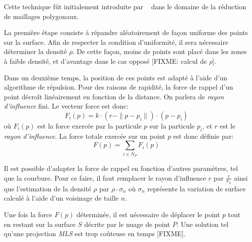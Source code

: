 Cette technique fût initialement introduite par \citeauthor{Turk1992}~\cite{Turk1992} dans le domaine de la réduction de maillages polygonaux.

La première étape consiste à répandre aléatoirement de façon uniforme des points sur la surface. Afin de respecter la condition d'uniformité, il sera nécessaire déterminer la densité $\rho$. De cette façon, moins de points sont placé dans les zones à faible densité, et d'avantage dans le cas opposé [FIXME: calcul de $\rho$].

Dans un deuxième temps, la position de ces points est adapté à l'aide d'un algorithme de répulsion. Pour des raisons de rapidité, la force de rappel d'un point décroît linéairement en fonction de la distance. On parlera de \emph{rayon d'influence} fini. Le vecteur force est donc:
$$F_i(p)=k\cdot(r-\|p-p_i\|)\cdot(p-p_i)$$
où $F_i(p)$ est la force exercée par la particule $p$ sur la particule $p_i$, et $r$ est le \emph{rayon d'influence}.
La force totale exercée sur un point $p$ est donc définie par:
$$F(p)=\sum\limits_{i\in N_P}F_i(p)$$

Il est possible d'adapter la force de rappel en fonction d'autres paramètres, tel que la courbure. Pour ce faire, il faut remplacer le rayon d'influence $r$ par $\frac{r}{\sigma_n}$ ainsi que l'estimation de la densité $\rho$ par $\rho\cdot\sigma_n$ où $\sigma_n$ représente la variation de surface calculé à l'aide d'un voisinage de taille $n$.

Une fois la force $F(p)$ déterminée, il est nécessaire de déplacer le point $p$ tout en restant sur la surface $S$ décrite par le nuage de point $P$. Une solution tel qu'une projection \emph{MLS} est trop coûteuse en temps [FIXME].